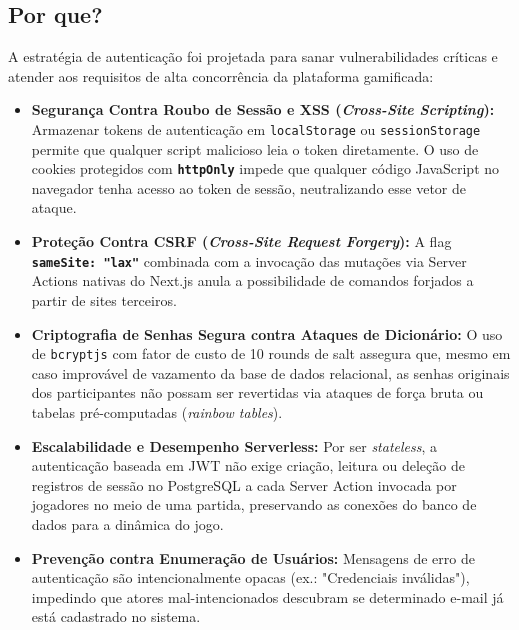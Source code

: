 \documentclass[12pt,a4paper]{article}
\begin{document}
\subsection{Por que?}
A estratégia de autenticação foi projetada para sanar vulnerabilidades críticas e atender aos requisitos de alta concorrência da plataforma gamificada:
\begin{itemize}
  \item \textbf{Segurança Contra Roubo de Sessão e XSS (\textit{Cross-Site Scripting}):} Armazenar tokens de autenticação em \texttt{localStorage} ou \texttt{sessionStorage} permite que qualquer script malicioso leia o token diretamente. O uso de cookies protegidos com \textbf{\texttt{httpOnly}} impede que qualquer código JavaScript no navegador tenha acesso ao token de sessão, neutralizando esse vetor de ataque.
  \item \textbf{Proteção Contra CSRF (\textit{Cross-Site Request Forgery}):} A flag \textbf{\texttt{sameSite: "lax"}} combinada com a invocação das mutações via Server Actions nativas do Next.js anula a possibilidade de comandos forjados a partir de sites terceiros.
  \item \textbf{Criptografia de Senhas Segura contra Ataques de Dicionário:} O uso de \texttt{bcryptjs} com fator de custo de 10 rounds de salt assegura que, mesmo em caso improvável de vazamento da base de dados relacional, as senhas originais dos participantes não possam ser revertidas via ataques de força bruta ou tabelas pré-computadas (\textit{rainbow tables}).
  \item \textbf{Escalabilidade e Desempenho Serverless:} Por ser \textit{stateless}, a autenticação baseada em JWT não exige criação, leitura ou deleção de registros de sessão no PostgreSQL a cada Server Action invocada por jogadores no meio de uma partida, preservando as conexões do banco de dados para a dinâmica do jogo.
  \item \textbf{Prevenção contra Enumeração de Usuários:} Mensagens de erro de autenticação são intencionalmente opacas (ex.: "Credenciais inválidas"), impedindo que atores mal-intencionados descubram se determinado e-mail já está cadastrado no sistema.
\end{itemize}
\end{document}
